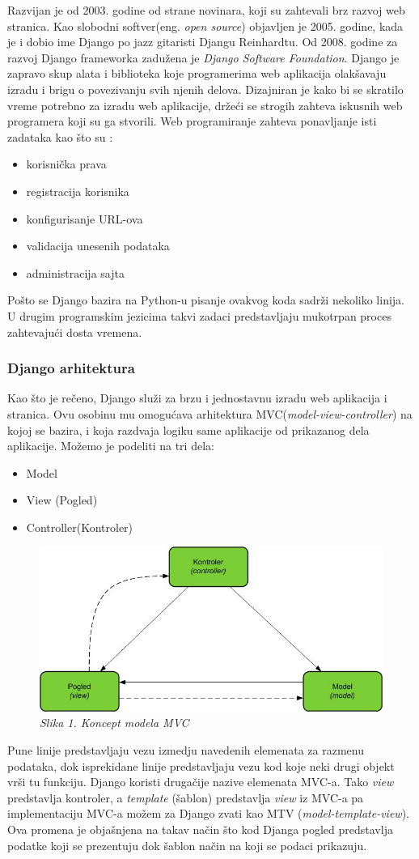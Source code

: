 \documentclass[12pt]{article}
\begin{document}
Razvijan je od 2003. godine od strane novinara, koji su zahtevali brz razvoj web stranica. Kao slobodni softver(eng. \textsl{open source}) objavljen je 2005. godine, kada je i dobio ime Django po jazz gitaristi Djangu Reinhardtu. Od 2008. godine za razvoj Django frameworka zadužena je \textsl{Django Software Foundation}.
Django je zapravo skup alata i biblioteka koje programerima web aplikacija olakšavaju 
izradu i brigu o povezivanju svih njenih delova. Dizajniran je kako bi se skratilo vreme potrebno za izradu web aplikacije, držeći se strogih zahteva iskusnih web programera koji su ga stvorili. Web programiranje zahteva ponavljanje isti zadataka kao što su :
\begin{itemize}
\item korisnička prava
\item registracija korisnika
\item konfigurisanje URL-ova
\item validacija unesenih podataka
\item administracija sajta
\end{itemize}
Pošto se Django bazira na Python-u pisanje ovakvog koda sadrži nekoliko linija. U drugim programskim jezicima takvi zadaci predstavljaju mukotrpan proces zahtevajući dosta vremena. 
\subsubsection{Django arhitektura}
Kao što je rečeno, Django služi za brzu i jednostavnu izradu web aplikacija i stranica.  Ovu osobinu mu omogućava arhitektura MVC(\textsl{model-view-controller}) na kojoj se bazira, i koja razdvaja logiku same aplikacije od prikazanog dela aplikacije. Možemo je podeliti na tri dela:
\begin{itemize}
\item Model 
\item View (Pogled)
\item Controller(Kontroler)
\end{itemize}
\begin{figure}[h!]
\centering
\includegraphics[width=0.6\linewidth]{django.jpeg}
\caption*{\textsl{Slika 1. Koncept modela MVC }}
\end{figure}
Pune linije predstavljaju vezu izmedju navedenih elemenata za razmenu podataka, dok isprekidane linije predstavljaju vezu kod koje neki drugi objekt vrši tu funkciju. Django koristi drugačije nazive elemenata MVC-a. Tako \textsl{view} predstavlja kontroler, a \textsl{template} (šablon) predstavlja \textsl{view} iz MVC-a pa implementaciju MVC-a možem za Django zvati kao MTV (\textsl{model-template-view}).  Ova promena je objašnjena na takav način što kod Djanga pogled predstavlja podatke koji se prezentuju dok šablon način na koji se podaci prikazuju. 
\end{document}
